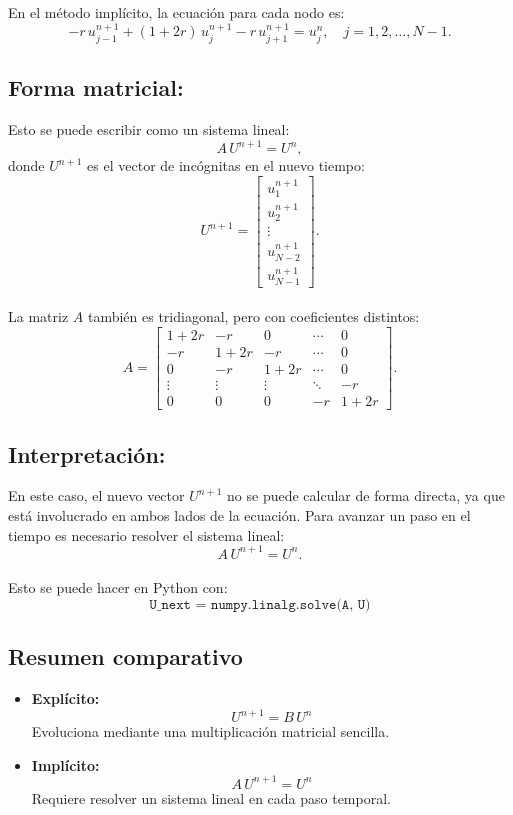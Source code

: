 \documentclass[12pt,a4paper]{article}
\begin{document}
En el método implícito, la ecuación para cada nodo es:
\[
-r\,u_{j-1}^{n+1} + (1+2r)\,u_j^{n+1} - r\,u_{j+1}^{n+1} = u_j^n,
\quad j = 1, 2, \dots, N-1.
\]

\subsection*{Forma matricial:} 
Esto se puede escribir como un sistema lineal:
\[
A\,U^{n+1} = U^n,
\]
donde \(U^{n+1}\) es el vector de incógnitas en el nuevo tiempo:
\[
U^{n+1} = 
\begin{bmatrix}
u_1^{n+1} \\[4pt] u_2^{n+1} \\[4pt] \vdots \\[4pt] u_{N-2}^{n+1} \\[4pt] u_{N-1}^{n+1}
\end{bmatrix}.
\] \\

La matriz \(A\) también es tridiagonal, pero con coeficientes distintos:
\[
A = 
\begin{bmatrix}
1+2r & -r    & 0     & \cdots & 0 \\[4pt]
-r    & 1+2r & -r    & \cdots & 0 \\[4pt]
0     & -r    & 1+2r & \cdots & 0 \\[4pt]
\vdots& \vdots& \vdots& \ddots & -r \\[4pt]
0     & 0     & 0     & -r     & 1+2r
\end{bmatrix}.
\]

\subsection*{Interpretación:} 
En este caso, el nuevo vector \(U^{n+1}\) no se puede calcular de forma directa, ya que está involucrado en ambos lados de la ecuación.  
Para avanzar un paso en el tiempo es necesario resolver el sistema lineal:
\[
A\,U^{n+1} = U^n.
\] \\

Esto se puede hacer en Python con:
\[
\texttt{U\_next = numpy.linalg.solve(A, U)}
\]

\subsection{Resumen comparativo}

\begin{itemize}
    \item \textbf{Explícito:}  
    \[
    U^{n+1} = B\,U^n
    \]
    Evoluciona mediante una multiplicación matricial sencilla.
    
    \item \textbf{Implícito:}  
    \[
    A\,U^{n+1} = U^n
    \]
    Requiere resolver un sistema lineal en cada paso temporal.
\end{itemize}
\end{document}
